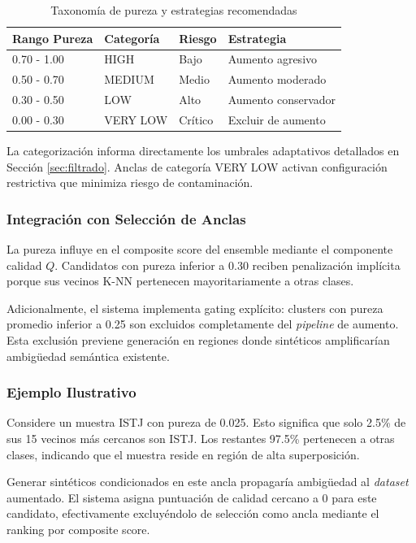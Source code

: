 \begin{table}[h]
\centering
\caption{Taxonomía de pureza y estrategias recomendadas}
\label{tab:purity_taxonomy}
\begin{tabular}{llll}
\hline
Rango Pureza & Categoría & Riesgo & Estrategia \\
\hline
0.70 - 1.00 & HIGH & Bajo & Aumento agresivo \\
0.50 - 0.70 & MEDIUM & Medio & Aumento moderado \\
0.30 - 0.50 & LOW & Alto & Aumento conservador \\
0.00 - 0.30 & VERY LOW & Crítico & Excluir de aumento \\
\hline
\end{tabular}
\end{table}

La categorización informa directamente los umbrales adaptativos detallados en Sección \ref{sec:filtrado}. Anclas de categoría VERY LOW activan configuración restrictiva que minimiza riesgo de contaminación.

\subsubsection*{Integración con Selección de Anclas}

La pureza influye en el composite score del ensemble mediante el componente calidad $Q$. Candidatos con pureza inferior a 0.30 reciben penalización implícita porque sus vecinos K-NN pertenecen mayoritariamente a otras clases.

Adicionalmente, el sistema implementa gating explícito: clusters con pureza promedio inferior a 0.25 son excluidos completamente del \textit{pipeline} de aumento. Esta exclusión previene generación en regiones donde sintéticos amplificarían ambigüedad semántica existente.

\subsubsection*{Ejemplo Ilustrativo}

Considere un muestra ISTJ con pureza de 0.025. Esto significa que solo 2.5\% de sus 15 vecinos más cercanos son ISTJ. Los restantes 97.5\% pertenecen a otras clases, indicando que el muestra reside en región de alta superposición.

Generar sintéticos condicionados en este ancla propagaría ambigüedad al \textit{dataset} aumentado. El sistema asigna puntuación de calidad cercano a 0 para este candidato, efectivamente excluyéndolo de selección como ancla mediante el ranking por composite score.

